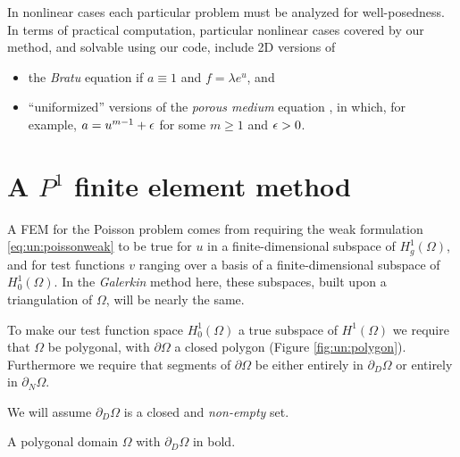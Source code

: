 In nonlinear cases each particular problem must be analyzed for well-posedness.  In terms of practical computation, particular nonlinear cases covered by our method, and solvable using our code, include 2D versions of
\begin{itemize}
\item the \emph{Bratu} equation if $a\equiv 1$ and $f=\lambda e^u$, and
\item ``uniformized'' versions of the \emph{porous medium} equation \citep{Ockendonetal2003}, in which, for example, $a=u^{m-1}+\epsilon$ for some $m\ge 1$ and $\epsilon>0$.
\end{itemize}


\section{A $P^1$ finite element method}


A FEM for the Poisson problem comes from requiring the weak formulation \eqref{eq:un:poissonweak} to be true for $u$ in a finite-dimensional subspace of $H_{g}^1(\Omega)$, and for test functions $v$ ranging over a basis of a finite-dimensional subspace of $H_{0}^1(\Omega)$.  In the \emph{Galerkin} method here, these subspaces, built upon a triangulation of $\Omega$, will be nearly the same.

To make our test function space $H_{0}^1(\Omega)$ a true subspace of $H^1(\Omega)$ we require that $\Omega$ be polygonal, with $\partial\Omega$ a closed polygon (Figure \ref{fig:un:polygon}).  Furthermore we require that segments of $\partial\Omega$ be either entirely in $\partial_D\Omega$ or entirely in $\partial_N\Omega$.

We will assume $\partial_D\Omega$ is a closed and \emph{non-empty} set.

\begin{marginfigure}

\caption{A polygonal domain $\Omega$ with $\partial_D\Omega$ in bold.}
\label{fig:un:polygon}
\end{marginfigure}


